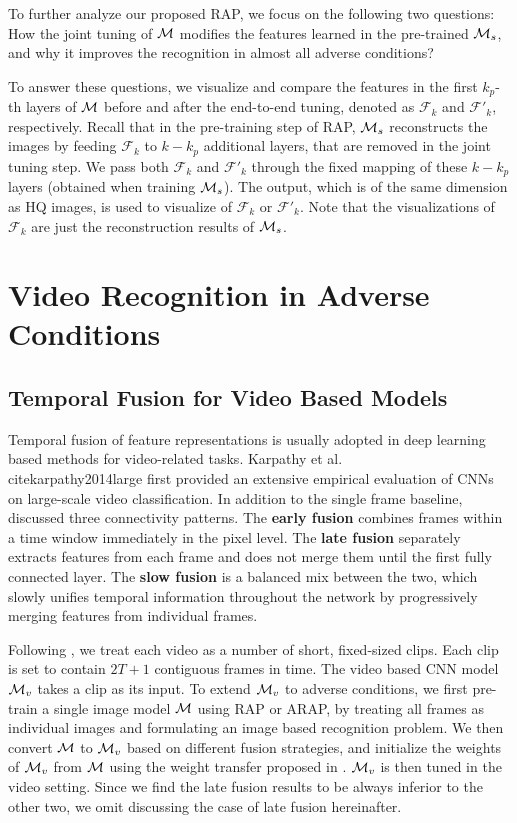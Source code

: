 \documentclass[10pt,twocolumn,twoside]{IEEEtran} %
\begin{document}
To further analyze our proposed RAP, we focus on the following two questions:
How the joint tuning of ${\mathcal{M}}$ modifies the features learned in the pre-trained ${\mathcal{M}}_s$, and why it improves the recognition in almost all adverse conditions? 

To answer these questions, we visualize and compare the features in the first $k_p$-th layers of ${\mathcal{M}}$ before and after the end-to-end tuning, denoted as $\mathcal{F}_k$ and $\mathcal{F}'_k$, respectively.
Recall that in the pre-training step of RAP, ${\mathcal{M}}_s$ reconstructs the images by feeding $\mathcal{F}_k$ to $k-k_p$ additional layers, that are removed in the joint tuning step. We pass both $\mathcal{F}_k$ and $\mathcal{F}'_k$ through the fixed mapping of these $k-k_p$ layers (obtained when training ${\mathcal{M}}_s$). The output, which is of the same dimension as HQ images, is used to visualize of $\mathcal{F}_k$ or $\mathcal{F}'_k$. Note that the visualizations of $\mathcal{F}_k$ are just the reconstruction results of ${\mathcal{M}}_s$. 

\section{Video Recognition in Adverse Conditions}\label{sec:video}\subsection{Temporal Fusion for Video Based Models}

Temporal fusion of feature representations is usually adopted in deep learning based methods for video-related tasks.
Karpathy et al.\\cite{karpathy2014large} first provided an extensive empirical evaluation of CNNs on large-scale video classification. In addition to the single frame baseline, \cite{karpathy2014large} discussed three connectivity
patterns. The \textbf{early fusion} combines frames within a time window immediately in the
pixel level. 
The \textbf{late fusion} separately extracts features from each frame  and does not merge them until the first fully connected layer.
The \textbf{slow fusion} is a balanced mix between the two, which slowly unifies temporal information throughout the network by progressively merging features from individual frames. 

Following \cite{karpathy2014large}, we treat each video as a number of short, fixed-sized clips. Each clip is set to contain $2T + 1$ contiguous frames in time.
The video based CNN model ${\mathcal{M}}_v$ takes a clip as its input. To extend ${\mathcal{M}}_v$ to adverse conditions, we first pre-train a single image model ${\mathcal{M}}$ using RAP or ARAP, by treating all frames as individual images and formulating an image based recognition problem. We then convert ${\mathcal{M}}$ to ${\mathcal{M}}_v$ based on different fusion strategies, and initialize the weights of ${\mathcal{M}}_v$ from ${\mathcal{M}}$ using the weight transfer proposed in \cite{kappeler2016video}. ${\mathcal{M}}_v$ is then tuned in the video setting. Since we find the late fusion results to be always inferior to the other two, we omit discussing the case of late fusion hereinafter.
\end{document}

